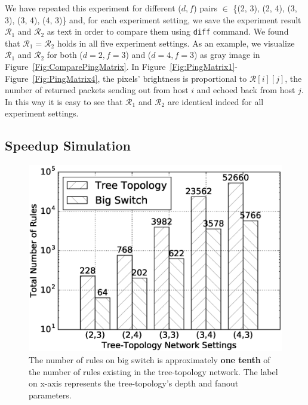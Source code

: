 We have repeated this experiment for different ($d, f$) pairs $\in$
\{(2, 3), (2, 4), (3, 3), (3, 4), (4, 3)\} and, for each experiment setting,
we save the experiment result $\mathcal{R}_1$ and $\mathcal{R}_2$
as text in order to compare them using \texttt{diff} command.
We found that $\mathcal{R}_1 = \mathcal{R}_2$ holds in all five experiment settings.
As an example, we visualize $\mathcal{R}_1$ and $\mathcal{R}_2$ for both ($d=2, f=3$)
and ($d=4, f=3$) as gray image in Figure~\ref{Fig:ComparePingMatrix}.
In Figure~\ref{Fig:PingMatrix1}-Figure~\ref{Fig:PingMatrix4},
the pixels' brightness is proportional to $\mathcal{R}[i][j]$,
the number of returned packets sending out from host $i$ and echoed back from host $j$.
In this way it is easy to see that $\mathcal{R}_1$ and $\mathcal{R}_2$ are identical
indeed for all experiment settings.

\subsection{Speedup Simulation}

\begin{figure}[h]
\centering
\includegraphics[scale=.42]{figures/comp_num_rules.eps}
\caption{The number of rules on big switch is approximately \textbf{one tenth} of the
        number of rules existing in the tree-topology network.
        The label on x-axis represents the tree-topology's depth and fanout parameters.}
\label{Fig:CompareNumRules}
\end{figure}


